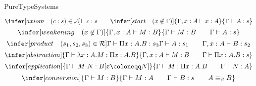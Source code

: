 \begin{entry}{PureTypeSystems}


\newcommand{\sorts}{\mathcal{S}}
\newcommand{\axioms}{\mathcal{A}}
\newcommand{\rules}{\mathcal{R}}
\newcommand{\variables}{\mathcal{V}}
\newcommand{\constants}{\mathcal{C}}
\newcommand{\terms}{\mathcal{T}}

\newcommand{\union}{\cup}

\newcommand{\Prop}{\ast}
\newcommand{\Type}{\square}
\newcommand{\Kind}{\triangle}

\newcommand{\entails}{\vdash}

\newcommand{\negvspace}{\vspace{-1ex}}

\begin{calculus}

\negvspace
\[ \infer[axiom\quad (c : s) \in \axioms]{\entails c : s}{ } \qquad
   \infer[start\quad (x \not\in \Gamma)]{\Gamma, x : A \entails x : A}{\Gamma \entails A : s} \]
\[ \infer[weakening\quad (x\not\in\Gamma)]{\Gamma, x : A \entails M : B}{\Gamma \entails M : B \qquad \Gamma \entails A : s} \]
\[ \infer[product\quad (s_1,s_2,s_3)\in\rules]{\Gamma \entails \Pi x : A. B : s_3}{\Gamma \entails A : s_1 \qquad \Gamma, x : A \entails B : s_2} \]
\[ \infer[abstraction]{\Gamma \entails \lambda x: A. M : \Pi x : A. B}{\Gamma, x : A \entails M : B \qquad \Gamma \entails \Pi x : A. B : s} \]
\[ \infer[application]{\Gamma \entails M~N : B[x \coloneqq N]}{\Gamma \entails M : \Pi x : A. B \qquad \Gamma \entails N : A} \]
\[ \infer[conversion]{\Gamma \entails M : B}{\Gamma \entails M : A \qquad \Gamma \entails B : s \qquad A \equiv_\beta B} \]

\end{calculus}



\end{entry}
